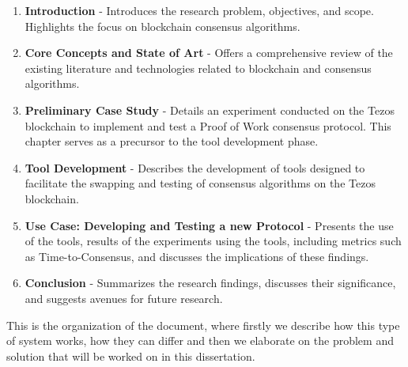 \begin{enumerate}
\item \textbf{Introduction} - Introduces the research problem, objectives, and scope. Highlights the focus on blockchain consensus algorithms.

\item \textbf{Core Concepts and State of Art} - Offers a comprehensive review of the existing literature and technologies related to blockchain and consensus algorithms.

\item \textbf{Preliminary Case Study} - Details an experiment conducted on the Tezos blockchain to implement and test a Proof of Work consensus protocol. This chapter serves as a precursor to the tool development phase.

\item \textbf{Tool Development} - Describes the development of tools designed to facilitate the swapping and testing of consensus algorithms on the Tezos blockchain.

\item \textbf{Use Case: Developing and Testing a new Protocol} - Presents the use of the tools, results of the experiments using the tools, including metrics such as Time-to-Consensus, and discusses the implications of these findings.

\item \textbf{Conclusion} - Summarizes the research findings, discusses their significance, and suggests avenues for future research.
\end{enumerate}

This is the organization of the document, where firstly we describe how this type of system works, how they can differ and then we elaborate on the problem and solution that will be worked on in this dissertation.
